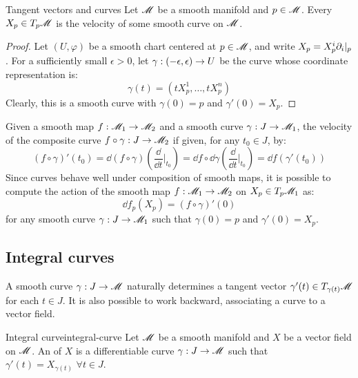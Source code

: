 \begin{proposition}{Tangent vectors and curves}{}
  Let $ \mathscr{M} $ be a smooth manifold and $ p \in \mathscr{M} $. Every $ X_p \in T_p\mathscr{M} $ is the velocity of some smooth curve on $ \mathscr{M} $.
\end{proposition}

\begin{proofbox}
  \begin{proof}
    Let $ (U,\varphi) $ be a smooth chart centered at $ p \in \mathscr{M} $, and write $ X_p = X_p^i \partial_i \vert_p $. For a sufficiently small $ \epsilon > 0 $, let $ \gamma : (-\epsilon , \epsilon) \rightarrow U $ be the curve whose coordinate representation is:
    \begin{equation*}
      \gamma(t) = (t X_p^1 , \dots , t X_p^n)
    \end{equation*}
    Clearly, this is a smooth curve with $ \gamma(0) = p $ and $ \gamma'(0) = X_p $.
  \end{proof}
\end{proofbox}

Given a smooth map $ f : \mathscr{M}_1 \rightarrow \mathscr{M}_2 $ and a smooth curve $ \gamma : J \rightarrow \mathscr{M}_1 $, the velocity of the composite curve $ f \circ \gamma : J \rightarrow \mathscr{M}_2 $ if given, for any $ t_0 \in J $, by:
\begin{equation}
  (f \circ \gamma)'(t_0) = \dd (f \circ \gamma) \left( \frac{\dd}{\dd t} \bigg\vert_{t_0} \right) = \dd f \circ \dd \gamma \left( \frac{\dd}{\dd t} \bigg\vert_{t_0} \right) = \dd f(\gamma'(t_0))
  \label{eq:composite-curve}
\end{equation}
Since curves behave well under composition of smooth maps, it is possible to compute the action of the smooth map $ f : \mathscr{M}_1 \rightarrow \mathscr{M}_2 $ on $ X_p \in T_p\mathscr{M}_1 $ as:
\begin{equation}
  \dd f_p(X_p) = (f \circ \gamma)'(0)
\end{equation}
for any smooth curve $ \gamma : J \rightarrow \mathscr{M}_1 $ such that $ \gamma(0) = p $ and $ \gamma'(0) = X_p $.

\subsection{Integral curves}

A smooth curve $ \gamma : J \rightarrow \mathscr{M} $ naturally determines a tangent vector $ \gamma'(t) \in T_{\gamma(t)}\mathscr{M} $ for each $ t \in J $. It is also possible to work backward, associating a curve to a vector field.

\begin{definition}{Integral curve}{integral-curve}
  Let $ \mathscr{M} $ be a smooth manifold and $ X $ be a vector field on $ \mathscr{M} $. An  of $ X $ is a differentiable curve $ \gamma : J \rightarrow \mathscr{M} $ such that $ \gamma'(t) = X_{\gamma(t)} \,\,\forall t \in J $.
\end{definition}

